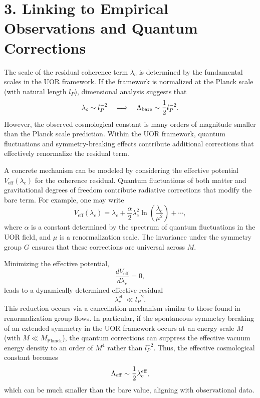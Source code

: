 \documentclass[12pt]{article}
\begin{document}
\section*{3. Linking to Empirical Observations and Quantum Corrections}
The scale of the residual coherence term \(\lambda_c\) is determined by the fundamental scales in the UOR framework. If the framework is normalized at the Planck scale (with natural length \(l_P\)), dimensional analysis suggests that
\[
\lambda_c \sim l_P^{-2} \quad \Longrightarrow \quad \Lambda_{\rm bare} \sim \frac{1}{2}l_P^{-2}.
\]
However, the observed cosmological constant is many orders of magnitude smaller than the Planck scale prediction. Within the UOR framework, quantum fluctuations and symmetry-breaking effects contribute additional corrections that effectively renormalize the residual term.

A concrete mechanism can be modeled by considering the effective potential \(V_{\text{eff}}(\lambda_c)\) for the coherence residual. Quantum fluctuations of both matter and gravitational degrees of freedom contribute radiative corrections that modify the bare term. For example, one may write
\[
V_{\text{eff}}(\lambda_c) = \lambda_c + \frac{\alpha}{2}\lambda_c^2 \ln\left(\frac{\lambda_c}{\mu^2}\right) + \cdots,
\]
where \(\alpha\) is a constant determined by the spectrum of quantum fluctuations in the UOR field, and \(\mu\) is a renormalization scale. The invariance under the symmetry group \(G\) ensures that these corrections are universal across \(M\).

Minimizing the effective potential,
\[
\frac{dV_{\text{eff}}}{d\lambda_c} = 0,
\]
leads to a dynamically determined effective residual
\[
\lambda_c^{\text{eff}} \ll l_P^{-2}.
\]
This reduction occurs via a cancellation mechanism similar to those found in renormalization group flows. In particular, if the spontaneous symmetry breaking of an extended symmetry in the UOR framework occurs at an energy scale \(M\) (with \(M \ll M_{\text{Planck}}\)), the quantum corrections can suppress the effective vacuum energy density to an order of \(M^4\) rather than \(l_P^{-2}\). Thus, the effective cosmological constant becomes
\[
\Lambda_{\rm eff} \sim \frac{1}{2}\lambda_c^{\text{eff}},
\]
which can be much smaller than the bare value, aligning with observational data.
\end{document}
